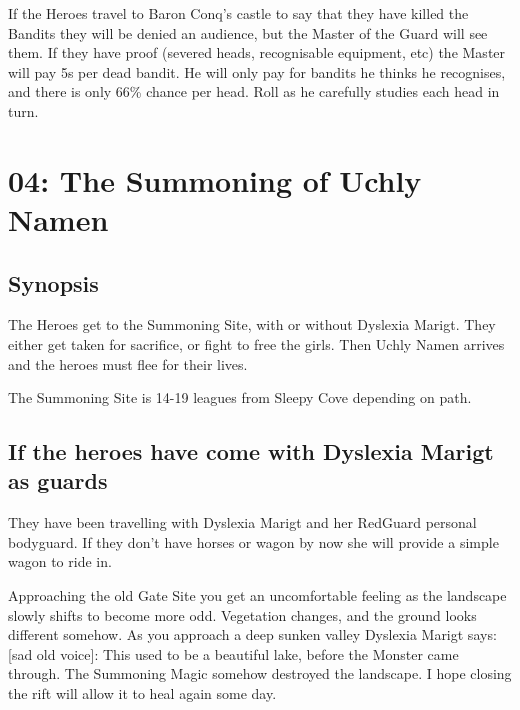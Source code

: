 If the Heroes travel to Baron Conq's castle to say that they have killed the Bandits they will be denied an audience, but the Master of the Guard will see them. If they have proof (severed heads, recognisable equipment, etc) the Master will pay 5s per dead bandit. He will only pay for bandits he thinks he recognises, and there is only 66\% chance per head. Roll as he carefully studies each head in turn.













\clearpage
{}
\section*{04: The Summoning of Uchly Namen}


\subsection*{Synopsis}
The Heroes get to the Summoning Site, with or without Dyslexia Marigt. They either get taken for sacrifice, or fight to free the girls. Then Uchly Namen arrives and the heroes must flee for their lives.

The Summoning Site is 14-19 leagues from Sleepy Cove depending on path.


\subsection*{If the heroes have come with Dyslexia Marigt as guards}
They have been travelling with Dyslexia Marigt and her RedGuard personal bodyguard. If they don't have horses or wagon by now she will provide a simple wagon to ride in.
\begin{readoutloud}
Approaching the old Gate Site you get an uncomfortable feeling as the landscape slowly shifts to become more odd. Vegetation changes, and the ground looks different somehow. As you approach a deep sunken valley Dyslexia Marigt says:\\

\textnormal{[sad old voice]:} This used to be a beautiful lake, before the Monster came through. The Summoning Magic somehow destroyed the landscape. I hope closing the rift will allow it to heal again some day.
\end{readoutloud}

